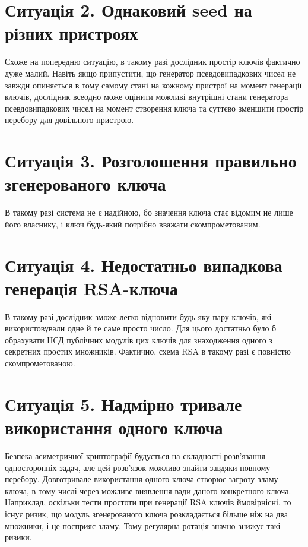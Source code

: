 \documentclass{kpi-lab}
\begin{document}
\section{
  \textbf{Ситуація 2.} Однаковий seed на різних пристроях
}

Схоже на попередню ситуацію, в такому разі дослідник
простір ключів фактично дуже малий.
Навіть якщо припустити, що генератор псевдовипадкових чисел
не завжди опиняється в тому самому стані на кожному
пристрої на момент генерації ключів,
дослідник всеодно може оцінити можливі внутрішні стани генератора
псевдовипадкових чисел на момент створення ключа та суттєво
зменшити простір перебору для довільного пристрою.

\section{
  \textbf{Ситуація 3.} Розголошення правильно згенерованого ключа
}

В такому разі система не є надійною, бо значення ключа стає
відомим не лише його власнику, і ключ будь-який потрібно вважати
скомпрометованим.

\section{
  \textbf{Ситуація 4.} Недостатньо випадкова генерація RSA-ключа
}

В такому разі дослідник зможе легко відновити будь-яку пару
ключів, які використовували одне й те саме просто число.
Для цього достатньо було б обрахувати НСД публічних модулів
цих ключів для знаходження одного з секретних простих
множників. Фактично, схема RSA в такому разі є повністю
скомпрометованою.

\section{
  \textbf{Ситуація 5.} Надмірно тривале використання одного ключа
}

Безпека асиметричної криптографії будується на складності
розв'язання односторонніх задач, але цей розв'язок
можливо знайти завдяки повному перебору. Довготривале
використання одного ключа створює загрозу зламу ключа,
в тому числі через можливе виявлення вади даного конкретного ключа.
Наприклад, оскільки тести простоти при генерації RSA ключів
ймовірнісні, то існує ризик, що модуль згенерованого ключа
розкладається більше ніж на два множники, і це посприяє зламу.
Тому регулярна ротація значно знижує такі ризики.
\end{document}
